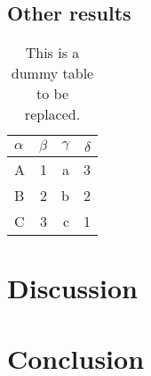 \lipsum[2-3]

\subsection{Other results}
\lipsum[2-3]

\begin{table}
  \centering
  \begin{tabular}{lrrr}
  \toprule
  $\alpha$   & $\beta$ & $\gamma$ & $\delta$ \\
  \midrule
  A          & 1       & a        & 3        \\
  B          & 2       & b        & 2        \\
  C          & 3       & c        & 1        \\
  \bottomrule
  \end{tabular}
  \caption{This is a dummy table to be replaced.}
  \label{tab:dummytable}
\end{table}



\section{Discussion}
\lipsum[2-9]


\section{Conclusion}
\lipsum[2]



